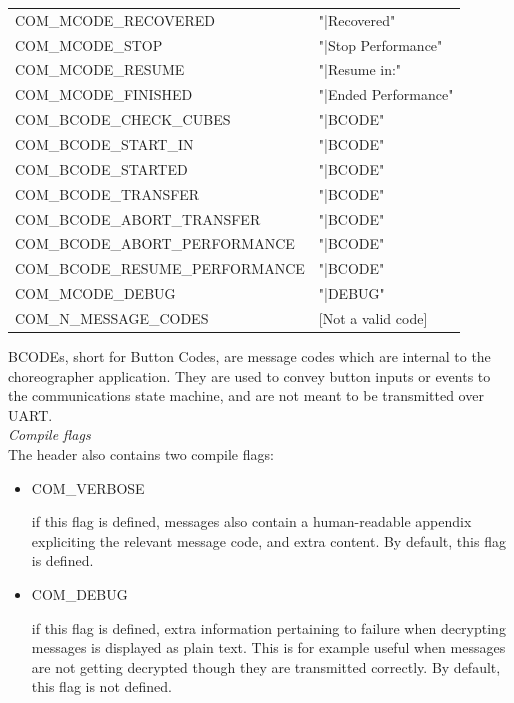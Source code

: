 \begin{table}[ht]
\begin{center}
\begin{tabular}{ll}
COM\_MCODE\_RECOVERED           & "|Recovered"         \\
COM\_MCODE\_STOP                & "|Stop Performance"  \\
COM\_MCODE\_RESUME              & "|Resume in:"        \\
COM\_MCODE\_FINISHED            & "|Ended Performance" \\
COM\_BCODE\_CHECK\_CUBES        & "|BCODE"             \\
COM\_BCODE\_START\_IN           & "|BCODE"             \\
COM\_BCODE\_STARTED             & "|BCODE"             \\
COM\_BCODE\_TRANSFER            & "|BCODE"             \\
COM\_BCODE\_ABORT\_TRANSFER     & "|BCODE"             \\
COM\_BCODE\_ABORT\_PERFORMANCE  & "|BCODE"             \\
COM\_BCODE\_RESUME\_PERFORMANCE & "|BCODE"             \\
COM\_MCODE\_DEBUG               & "|DEBUG"             \\
COM\_N\_MESSAGE\_CODES          & [Not a valid code]  \\
 \hline
\end{tabular}
\end{center}
\end{table}

BCODEs, short for Button Codes, are message codes which are internal to the choreographer application. They are used to convey button inputs or events to the communications state machine, and are not meant to be transmitted over UART.\\


\textit{Compile flags}\\

The header also contains two compile flags:\\

\begin{itemize}
\item[] COM\_VERBOSE

	if this flag is defined, messages also contain a human-readable appendix expliciting the relevant message code, and extra content. By default, this flag is defined.

\item[] COM\_DEBUG

	if this flag is defined, extra information pertaining to failure when decrypting messages is displayed as plain text. This is for example useful when messages are not getting decrypted though they are transmitted correctly. By default, this flag is not defined.
    
\end{itemize}

